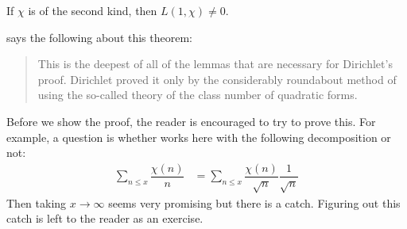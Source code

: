 \documentclass[elemannt.tex]{subfile}
\begin{document}
		\begin{proposition}\label{prop:non-vanising-second}
			If $\chi$ is of the second kind, then $L(1,\chi)\neq0$.
		\end{proposition}
	\textcite[pp. 121, Theorem 152]{landau_1969} says the following about this theorem:
		\begin{quote}
			This is the deepest of all of the lemmas that are necessary for Dirichlet's proof. Dirichlet proved it only by the considerably roundabout method of using the so-called theory of the class number of quadratic forms.
		\end{quote}
	Before we show the proof, the reader is encouraged to try to prove this. For example, a question is whether  works here with the following decomposition or not:
		\begin{align*}
			\sum_{n\leq x}\dfrac{\chi(n)}{n}
				& = \sum_{n\leq x}\dfrac{\chi(n)}{\sqrt{n}}\dfrac{1}{\sqrt{n}}
		\end{align*}
	Then taking $x\to\infty$ seems very promising but there is a catch. Figuring out this catch is left to the reader as an exercise.
\end{document}
